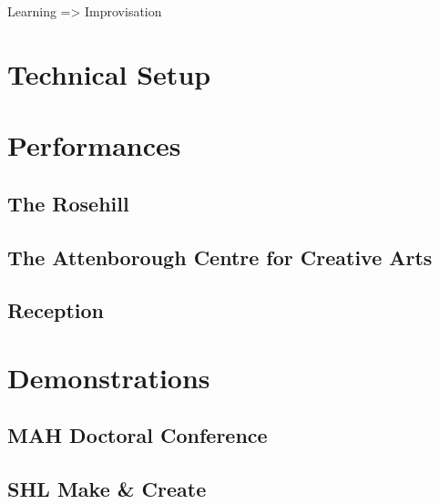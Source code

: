 Learning => Improvisation


\section{Technical Setup} \label{sec: performance-setup}




\section{Performances} \label{sec: performance-performances}
\subsection{The Rosehill} \label{sec: performance-performances-rosehill}
\subsection{The Attenborough Centre for Creative Arts} \label{sec: performance-performances-acca}
\subsection{Reception} \label{sec: performance-performances-reception}



\section{Demonstrations} \label{sec: performance-demonstrations}
\subsection{MAH Doctoral Conference} \label{sec: performance-demonstrations-mah}
\subsection{SHL Make \& Create} \label{sec: performance-demonstrations-shl}